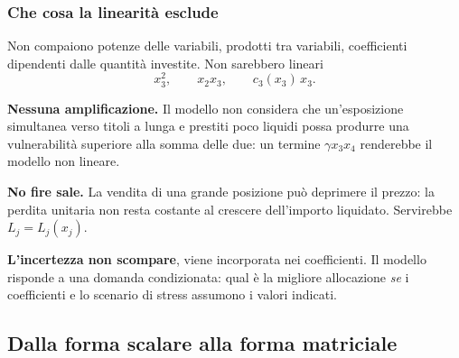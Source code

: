 \begin{frame}%
%

\frametitle{Che cosa la linearit\`{a} esclude}%
%

%


Non compaiono potenze delle variabili, prodotti tra variabili, coefficienti
dipendenti dalle quantit\`{a} investite. Non sarebbero lineari
\[
x_{3}^{2}, \qquad x_{2}x_{3}, \qquad c_{3}(x_{3})\,x_{3}.
\]


\medskip

\begin{stepitemize}
\item \textbf{Nessuna amplificazione.} Il modello non considera che
un'esposizione simultanea verso titoli a lunga e prestiti poco liquidi possa
produrre una vulnerabilit\`{a} superiore alla somma delle due: un termine
$\gamma x_{3}x_{4}$ renderebbe il modello non lineare.

\item \textbf{No fire sale.} La vendita di una grande posizione pu\`{o}
deprimere il prezzo: la perdita unitaria non resta costante al crescere
dell'importo liquidato. Servirebbe $L_{j}=L_{j}(x_{j})$.

\item \textbf{L'incertezza non scompare}, viene incorporata nei coefficienti.
Il modello risponde a una domanda condizionata: qual \`{e} la migliore
allocazione \emph{se} i coefficienti e lo scenario di stress assumono i valori indicati.
\end{stepitemize}

\medskip%

\transboxout
\end{frame}%






\subsection{Dalla forma scalare alla forma matriciale}%

